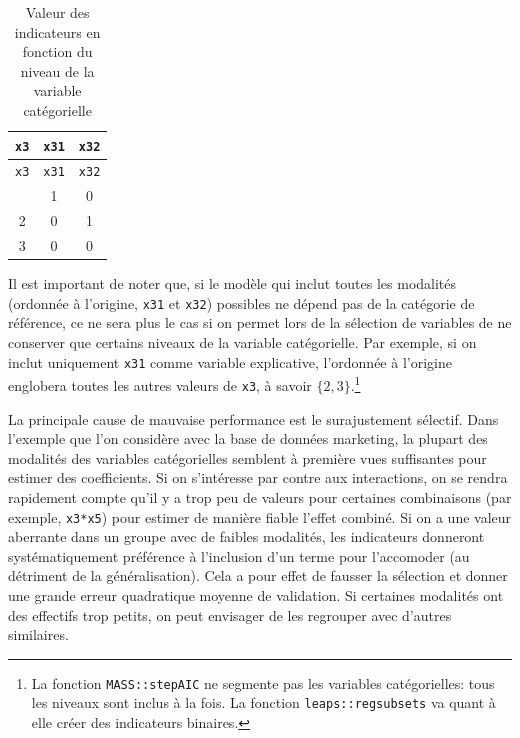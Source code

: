 \documentclass[
  11pt,
  letterpaper,
]{scrbook}
\theoremstyle{definition}
\theoremstyle{remark}
\begin{document}
\begin{longtable}[]{@{}ccc@{}}
\caption{Valeur des indicateurs en fonction du niveau de la variable
catégorielle}\label{tbl-02-dummy}\tabularnewline
\toprule\noalign{}
\texttt{x3} & \texttt{x31} & \texttt{x32} \\
\midrule\noalign{}
\endfirsthead
\toprule\noalign{}
\texttt{x3} & \texttt{x31} & \texttt{x32} \\
\midrule\noalign{}
\endhead
\bottomrule\noalign{}
\endlastfoot
1 & 1 & 0 \\
2 & 0 & 1 \\
3 & 0 & 0 \\
\end{longtable}

Il est important de noter que, si le modèle qui inclut toutes les
modalités (ordonnée à l'origine, \texttt{x31} et \texttt{x32}) possibles
ne dépend pas de la catégorie de référence, ce ne sera plus le cas si on
permet lors de la sélection de variables de ne conserver que certains
niveaux de la variable catégorielle. Par exemple, si on inclut
uniquement \texttt{x31} comme variable explicative, l'ordonnée à
l'origine englobera toutes les autres valeurs de \texttt{x3}, à savoir
\(\{2, 3\}\).\footnote{La fonction \texttt{MASS::stepAIC} ne segmente
  pas les variables catégorielles: tous les niveaux sont inclus à la
  fois. La fonction \texttt{leaps::regsubsets} va quant à elle créer des
  indicateurs binaires.}

\begin{tcolorbox}[enhanced jigsaw, coltitle=black, left=2mm, opacitybacktitle=0.6, colback=white, leftrule=.75mm, colframe=quarto-callout-tip-color-frame, toprule=.15mm, colbacktitle=quarto-callout-tip-color!10!white, opacityback=0, bottomtitle=1mm, toptitle=1mm, rightrule=.15mm, title=\textcolor{quarto-callout-tip-color}{\faLightbulb}\hspace{0.5em}{Danger de surajustement avec variables catégorielles}, breakable, titlerule=0mm, arc=.35mm, bottomrule=.15mm]

La principale cause de mauvaise performance est le surajustement
sélectif. Dans l'exemple que l'on considère avec la base de données
marketing, la plupart des modalités des variables catégorielles semblent
à première vues suffisantes pour estimer des coefficients. Si on
s'intéresse par contre aux interactions, on se rendra rapidement compte
qu'il y a trop peu de valeurs pour certaines combinaisons (par exemple,
\texttt{x3*x5}) pour estimer de manière fiable l'effet combiné. Si on a
une valeur aberrante dans un groupe avec de faibles modalités, les
indicateurs donneront systématiquement préférence à l'inclusion d'un
terme pour l'accomoder (au détriment de la généralisation). Cela a pour
effet de fausser la sélection et donner une grande erreur quadratique
moyenne de validation. Si certaines modalités ont des effectifs trop
petits, on peut envisager de les regrouper avec d'autres similaires.

\end{tcolorbox}
\end{document}
